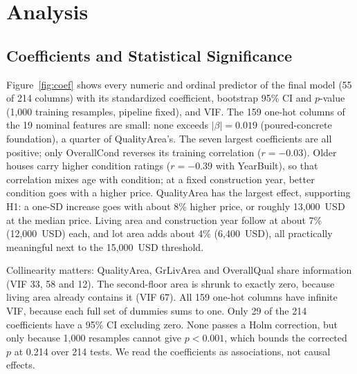 \section{Analysis}
\label{sec:analysis}

\subsection{Coefficients and Statistical Significance}
Figure~\ref{fig:coef} shows every numeric and ordinal predictor of the final model (55 of 214 columns) with its standardized coefficient, bootstrap 95\% CI and $p$-value (1{,}000 training resamples, pipeline fixed), and VIF.
The 159 one-hot columns of the 19 nominal features are small: none exceeds $|\beta| = 0.019$ (poured-concrete foundation), a quarter of QualityArea's.
The seven largest coefficients are all positive; only OverallCond reverses its training correlation ($r = -0.03$).
Older houses carry higher condition ratings ($r = -0.39$ with YearBuilt), so that correlation mixes age with condition; at a fixed construction year, better condition goes with a higher price.
QualityArea has the largest effect, supporting H1: a one-SD increase goes with about 8\% higher price, or roughly 13{,}000~USD at the median price.
Living area and construction year follow at about 7\% (12{,}000~USD) each, and lot area adds about 4\% (6{,}400~USD), all practically meaningful next to the 15{,}000~USD threshold.

Collinearity matters: QualityArea, GrLivArea and OverallQual share information (VIF 33, 58 and 12).
The second-floor area is shrunk to exactly zero, because living area already contains it (VIF 67).
All 159 one-hot columns have infinite VIF, because each full set of dummies sums to one.
Only 29 of the 214 coefficients have a 95\% CI excluding zero.
None passes a Holm correction, but only because 1{,}000 resamples cannot give $p < 0.001$, which bounds the corrected $p$ at 0.214 over 214 tests.
We read the coefficients as associations, not causal effects.

